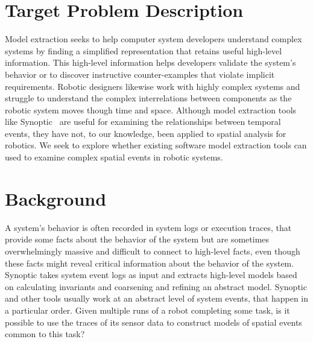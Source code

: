 \documentclass{article}
\begin{document}
\section{Target Problem Description}



Model extraction seeks to help computer system developers understand complex systems by finding a simplified representation that retains useful high-level information.
This high-level information helps developers validate the system's behavior or to discover instructive counter-examples that violate implicit requirements. 
Robotic designers likewise work with highly complex systems and struggle to understand the complex interrelations between components as the robotic system moves though time and space.
Although model extraction tools like Synoptic~\cite{schneider2010synoptic} are useful for examining the relationships between temporal events, they have not, to our knowledge, been applied to spatial analysis for robotics. 
We seek to explore whether existing software model extraction tools can used to examine complex spatial events in robotic systems.

\section{Background}
A system's behavior is often recorded in system logs or execution traces, that provide some facts about the behavior of the system but are sometimes overwhelmingly massive and difficult to connect to high-level facts, even though these facts might reveal critical information about the behavior of the system.
Synoptic takes system event logs as input and extracts high-level models based on calculating invariants and coarsening and refining an abstract model.
Synoptic and other tools usually work at an abstract level of system events, that happen in a particular order.
Given multiple runs of a robot completing some task, is it possible to use the traces of its sensor data to construct models of spatial events common to this task?
\end{document}
